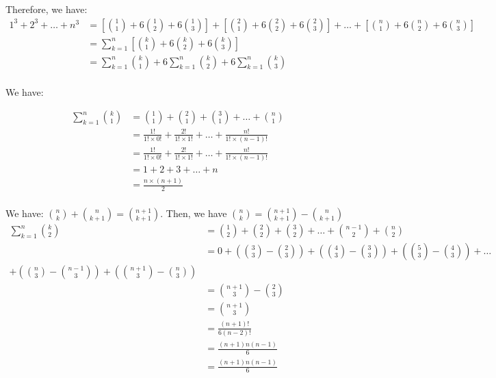 \documentclass[10pt]{article}
\begin{document}
\begin{enumerate}
\begin{enumerate}
Therefore, we have:
\begin{align*}
    1^3+2^3+\ldots+n^3 &= \left[\binom{1}{1}+6\binom{1}{2}+6\binom{1}{3}\right] + \left[\binom{2}{1}+6\binom{2}{2}+6\binom{2}{3}\right] + \ldots + \left[\binom{n}{1}+6\binom{n}{2}+6\binom{n}{3}\right] \\
    &= \sum\limits_{k=1}^n \left[\binom{k}{1}+6\binom{k}{2}+6\binom{k}{3}\right]\\
    &= \sum\limits_{k=1}^n\binom{k}{1}+6\sum\limits_{k=1}^n\binom{k}{2}+6\sum\limits_{k=1}^n\binom{k}{3} \\
\end{align*}

We have: 

\begin{align*}
    \sum\limits_{k=1}^n\binom{k}{1} &= \binom{1}{1} + \binom{2}{1} + \binom{3}{1} + \ldots + \binom{n}{1}  \\
    &= \frac{1!}{1!\times 0!} + \frac{2!}{1! \times 1!} + \ldots + \frac{n!}{1! \times (n-1)!} \\
    &= \frac{1!}{1!\times 0!} + \frac{2!}{1! \times 1!} + \ldots + \frac{n!}{1! \times (n-1)!} \\
    &= 1+ 2 + 3 + \ldots + n \\
    &= \frac{n \times (n+1)}{2} \\
\end{align*}

We have: $\binom{n}{k} + \binom{n}{k + 1} =\binom{n+1}{k + 1}$. Then, we have $\binom{n}{k} =\binom{n+1}{k + 1} - \binom{n}{k + 1}$
\begin{align*}
    \sum\limits_{k=1}^n\binom{k}{2} &= \binom{1}{2} + \binom{2}{2} + \binom{3}{2} + \ldots + \binom{n-1}{2} + \binom{n}{2}  \\
    &= 0 + \left(  \binom{3}{3} - \binom{2}{3} \right) + \left(  \binom{4}{3} - \binom{3}{3} \right) + \left(  \binom{5}{3} - \binom{4}{3}\right) + \ldots \\+ \left(  \binom{n}{3} - \binom{n-1}{3} \right) + \left(  \binom{n+1}{3} - \binom{n}{3} \right)\\
    &= \binom{n+1}{3} - \binom{2}{3} \\
    &= \binom{n+1}{3} \\
    &= \frac{(n+1)!}{6(n-2)!}\\
    &= \frac{(n+1)n(n-1)}{6}\\
    &= \frac{(n+1)n(n-1)}{6}
\end{align*}


\end{enumerate}
\end{enumerate}
\end{document}

